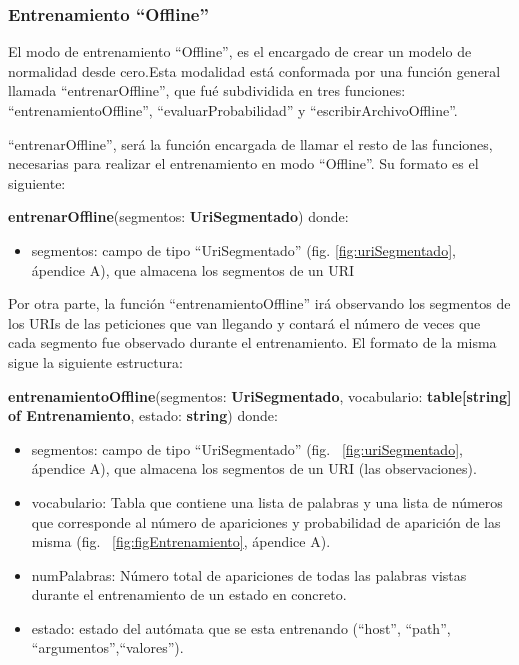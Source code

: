 \subsubsection{Entrenamiento ``Offline''}

El modo de entrenamiento ``Offline'', es el encargado de crear un modelo de normalidad desde cero.Esta modalidad está conformada por una
función general llamada ``entrenarOffline'', que fué subdividida en tres funciones: ``entrenamientoOffline'',
``evaluarProbabilidad'' y ``escribirArchivoOffline''.

``entrenarOffline'', será la función encargada de llamar el resto de las
funciones, necesarias para realizar el entrenamiento en modo ``Offline''. Su
formato es el siguiente:

\textbf{entrenarOffline}(segmentos: \textbf{UriSegmentado})
donde:

\begin{itemize}
\item segmentos: campo de tipo ``UriSegmentado'' (fig. \ref{fig:uriSegmentado}, ápendice A), que almacena los segmentos de un URI
\end{itemize}

Por otra parte, la función ``entrenamientoOffline'' irá observando los segmentos de los URIs de las peticiones que van llegando y contará el número de veces que cada segmento fue observado durante el entrenamiento. El formato de la misma sigue la siguiente estructura:

\textbf{entrenamientoOffline}(segmentos: \textbf{UriSegmentado}, vocabulario: \textbf{table[string] of Entrenamiento}, estado: \textbf{string})
donde:
\begin{itemize}
\item segmentos: campo de tipo ``UriSegmentado'' (fig. ~\ref{fig:uriSegmentado}, ápendice A), que almacena
los segmentos de un URI (las observaciones).
\item vocabulario: Tabla que contiene una lista de palabras y una lista de
números que corresponde al número de apariciones y probabilidad de
aparición de las misma (fig. ~\ref{fig:figEntrenamiento}, ápendice A).
\item numPalabras: Número total de apariciones de todas las palabras vistas durante el entrenamiento de un estado en concreto.
\item estado: estado del autómata que se esta entrenando (``host'', ``path'',
``argumentos'',``valores'').
\end{itemize}

